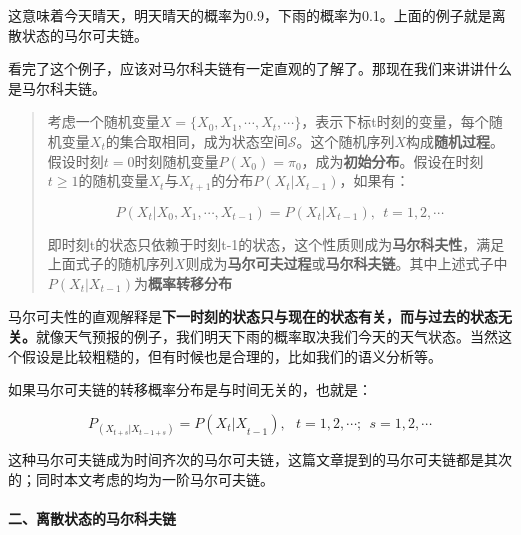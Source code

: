 这意味着今天晴天，明天晴天的概率为0.9，下雨的概率为0.1。上面的例子就是离散状态的马尔可夫链。

看完了这个例子，应该对马尔科夫链有一定直观的了解了。那现在我们来讲讲什么是马尔科夫链。

\begin{quote}
考虑一个随机变量\(X=\{X_0,X_1,\cdots,X_t,\cdots\}\)，表示下标t时刻的变量，每个随机变量\(X_t\)的集合取相同，成为状态空间\(\mathcal{S}\)。这个随机序列\(X\)构成\textbf{随机过程}。假设时刻\(t = 0\)时刻随机变量\(P(X_0)=\pi_0\)，成为\textbf{初始分布}。假设在时刻\(t\geq1\)的随机变量\(X_t\)与\(X_{t+1}\)的分布\(P(X_t|X_{t-1})\)，如果有：

\[P(X_t|X_0,X_1,\cdots ,X_{t-1})=P(X_t|X_{t-1}),\  \ t = 1,2, \cdots\]

即时刻t的状态只依赖于时刻t-1的状态，这个性质则成为\textbf{马尔科夫性}，满足上面式子的随机序列\(X\)则成为\textbf{马尔可夫过程}或\textbf{马尔科夫链}。其中上述式子中\(P(X_t|X_{t-1})\)为\textbf{概率转移分布}
\end{quote}

马尔可夫性的直观解释是\textbf{下一时刻的状态只与现在的状态有关，而与过去的状态无关。}就像天气预报的例子，我们明天下雨的概率取决我们今天的天气状态。当然这个假设是比较粗糙的，但有时候也是合理的，比如我们的语义分析等。

如果马尔可夫链的转移概率分布是与时间无关的，也就是：

\[P_({X_{t+s}|X_{t-1+s}})=P({X_{t}|X}_{t-1}),\ \ \ t = 1,2,\cdots;\ \ s = 1,2,\cdots\]

这种马尔可夫链成为时间齐次的马尔可夫链，这篇文章提到的马尔可夫链都是其次的；同时本文考虑的均为一阶马尔可夫链。

\hypertarget{ux4e8cux79bbux6563ux72b6ux6001ux7684ux9a6cux5c14ux79d1ux592bux94fe}{%
\paragraph{二、离散状态的马尔科夫链}\label{ux4e8cux79bbux6563ux72b6ux6001ux7684ux9a6cux5c14ux79d1ux592bux94fe}}

